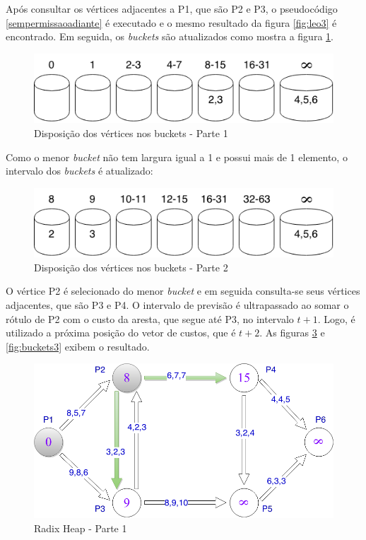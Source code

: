 Após consultar os vértices adjacentes a P1, que são P2 e P3, o pseudocódigo \ref{sempermissaoadiante}
é executado e o mesmo resultado da figura \ref{fig:leo3} é encontrado. Em seguida, os \textit{buckets} são atualizados
como mostra a figura \ref{fig:buckets1}.

\begin{figure}[htbp]
\centering
 \includegraphics[width=.50\textwidth]{chapters/fig/buckets1.png}
\caption{Disposição dos vértices nos buckets - Parte 1}
\label{fig:buckets1}
\end{figure}
\FloatBarrier

Como o menor \textit{bucket} não tem largura igual a 1 e possui mais de 1 elemento, o intervalo dos \textit{buckets}
é atualizado:

\begin{figure}[htbp]
\centering
 \includegraphics[width=.50\textwidth]{chapters/fig/buckets2.png}
\caption{Disposição dos vértices nos buckets - Parte 2}
\label{fig:buckets2}
\end{figure}
\FloatBarrier

O vértice P2 é selecionado do menor \textit{bucket} e em seguida consulta-se seus vértices adjacentes, que são P3 e P4.
O intervalo de previsão é ultrapassado ao somar o rótulo de P2 com o custo da aresta, que segue até P3, no intervalo $t + 1$. Logo, 
é utilizado a próxima posição do vetor de custos, que é $t + 2$. As figuras \ref{fig:limitesup1} e \ref{fig:buckets3} exibem o resultado.

\begin{figure}[htbp]
\centering
 \includegraphics[width=.50\textwidth]{chapters/fig/limitesup1.png}
\caption{Radix Heap - Parte 1}
\label{fig:limitesup1}
\end{figure}

